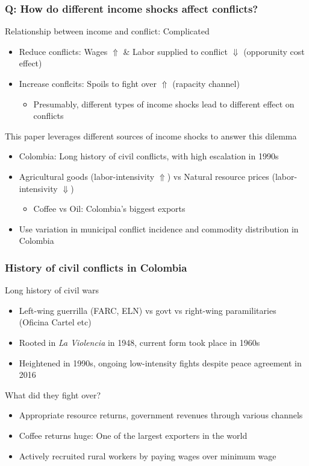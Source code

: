 \documentclass[aspectratio=169]{beamer}
\begin{document}
\begin{frame}
\frametitle{Q: How do different income shocks affect conflicts?} 
Relationship between income and conflict: Complicated
\begin{itemize}\setlength\itemsep{3pt}
\item Reduce conflicts: Wages $\Uparrow$ \& Labor supplied to conflict $\Downarrow$ (opporunity cost effect)
 \item Increase conflcits: Spoils to fight over $\Uparrow$ (rapacity channel)
 \begin{itemize}
\item Presumably, different types of income shocks lead to different effect on conflicts
\end{itemize}
\end{itemize}
\medskip
This paper leverages different sources of income shocks to answer this dilemma
\begin{itemize}\setlength\itemsep{3pt}
  \item Colombia: Long history of civil conflicts, with high escalation in 1990s
\item Agricultural goods (labor-intensivity $\Uparrow$) vs Natural resource prices (labor-intensivity $\Downarrow$)
 \begin{itemize}
\item Coffee vs Oil: Colombia's biggest exports
\end{itemize}
\item Use variation in municipal conflict incidence and commodity distribution in Colombia
\end{itemize}
\end{frame}


\begin{frame}
\frametitle{History of civil conflicts in Colombia} 
Long history of civil wars
\begin{itemize}\setlength\itemsep{3pt}
\item Left-wing guerrilla (FARC, ELN) vs govt vs right-wing paramilitaries (Oficina Cartel etc)
\item Rooted in \textit{La Violencia} in 1948, current form took place in 1960s
\item Heightened in 1990s, ongoing low-intensity fights despite peace agreement in 2016
\end{itemize}
\medskip
What did they fight over?
\begin{itemize}\setlength\itemsep{3pt}
\item Appropriate resource returns, government revenues through various channels
\item Coffee returns huge: One of the largest exporters in the world
\item Actively recruited rural workers by paying wages over minimum wage
\end{itemize}
\end{frame}
\end{document}
